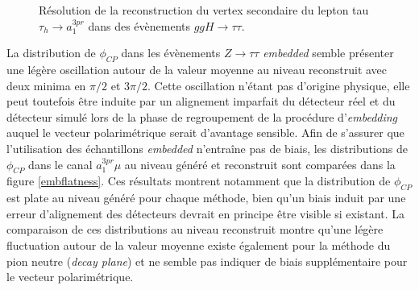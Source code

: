 \begin{figure}
\caption{Résolution de la reconstruction du vertex secondaire du lepton tau $\tau_h\to a_1^{3pr}$ dans des évènements $ggH\to\tau\tau$.}
\label{SVreso}
\end{figure}

La distribution de $\phi_{CP}$ dans les évènements $Z\to\tau\tau$ \textit{embedded} semble présenter une légère oscillation autour de la valeur moyenne au niveau reconstruit avec deux minima en $\pi/2$ et $3\pi/2$. Cette oscillation n'étant pas d'origine physique, elle peut toutefois être induite par un alignement imparfait du détecteur réel et du détecteur simulé lors de la phase de regroupement de la procédure d'\textit{embedding} auquel le vecteur polarimétrique serait d'avantage sensible. Afin de s'assurer que l'utilisation des échantillons \textit{embedded} n'entraîne pas de biais, les distributions de $\phi_{CP}$ dans le canal $a_1^{3pr}\mu$ au niveau généré et reconstruit sont comparées dans la figure \ref{embflatness}. Ces résultats montrent notamment que la distribution de $\phi_{CP}$ est plate au niveau généré pour chaque méthode, bien qu'un biais induit par une erreur d'alignement des détecteurs devrait en principe être visible si existant. La comparaison de ces distributions au niveau reconstruit montre qu'une légère fluctuation autour de la valeur moyenne existe également pour la méthode du pion neutre (\textit{decay plane}) et ne semble pas indiquer de biais supplémentaire pour le vecteur polarimétrique.

